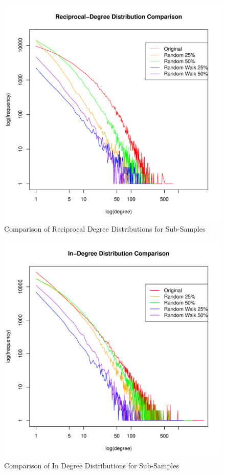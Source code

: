 \documentclass[pdftex,11pt,a4paper,twocolumn]{scrartcl}
\begin{document}
\begin{figure}[h!]
\centering
\includegraphics[width=\columnwidth]{subsampleComparison_recipDeg.pdf} 
\caption{Comparison of Reciprocal Degree Distributions for Sub-Samples \label{fig:ssRecipDeg}}
\end{figure}

\begin{figure}[h!]
\centering
\includegraphics[width=\columnwidth]{subsampleComparison_inDeg.pdf} 
\caption{Comparison of In Degree Distributions for Sub-Samples \label{fig:ssInDeg}}
\end{figure}
\end{document}
